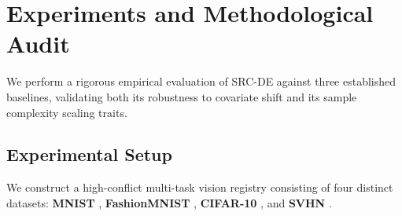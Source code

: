 \section{Experiments and Methodological Audit}
\label{submission:sec:experiments}

We perform a rigorous empirical evaluation of SRC-DE against three established baselines, validating both its robustness to covariate shift and its sample complexity scaling traits.

\subsection{Experimental Setup}
We construct a high-conflict multi-task vision registry consisting of four distinct datasets: {\bf MNIST} \cite{lecun1998gradient}, {\bf FashionMNIST} \cite{xiao2017fashion}, {\bf CIFAR-10} \cite{krizhevsky2009learning}, and {\bf SVHN} \cite{netzer2011reading}.
